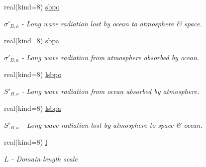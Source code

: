 \begin{DoxyCompactItemize}
\mbox{\label{structparams_1_1physicsconfiguration_a4283b7d6c37717f34af4146b6cf01c80}} 
real(kind=8) \hyperlink{structparams_1_1physicsconfiguration_a4283b7d6c37717f34af4146b6cf01c80}{sbpo}
\begin{DoxyCompactList}\small\item\em $\sigma'_{B,o}$ -\/ Long wave radiation lost by ocean to atmosphere \& space. \end{DoxyCompactList}\item 
\mbox{\label{structparams_1_1physicsconfiguration_a262af6cf3f3283d156146d2b63ac8c2c}} 
real(kind=8) \hyperlink{structparams_1_1physicsconfiguration_a262af6cf3f3283d156146d2b63ac8c2c}{sbpa}
\begin{DoxyCompactList}\small\item\em $\sigma'_{B,a}$ -\/ Long wave radiation from atmosphere absorbed by ocean. \end{DoxyCompactList}\item 
\mbox{\label{structparams_1_1physicsconfiguration_a43ed96def4e399dbdd2e3b2f19b32980}} 
real(kind=8) \hyperlink{structparams_1_1physicsconfiguration_a43ed96def4e399dbdd2e3b2f19b32980}{lsbpo}
\begin{DoxyCompactList}\small\item\em $S'_{B,o}$ -\/ Long wave radiation from ocean absorbed by atmosphere. \end{DoxyCompactList}\item 
\mbox{\label{structparams_1_1physicsconfiguration_a0e942bc800b781c4908637b6e3765b95}} 
real(kind=8) \hyperlink{structparams_1_1physicsconfiguration_a0e942bc800b781c4908637b6e3765b95}{lsbpa}
\begin{DoxyCompactList}\small\item\em $S'_{B,a}$ -\/ Long wave radiation lost by atmosphere to space \& ocean. \end{DoxyCompactList}\item 
\mbox{\label{structparams_1_1physicsconfiguration_ac0bd22df90fc93b90795de516f39e2bd}} 
real(kind=8) \hyperlink{structparams_1_1physicsconfiguration_ac0bd22df90fc93b90795de516f39e2bd}{l}
\begin{DoxyCompactList}\small\item\em $L$ -\/ Domain length scale \end{DoxyCompactList}\item 

\end{DoxyCompactItemize}
